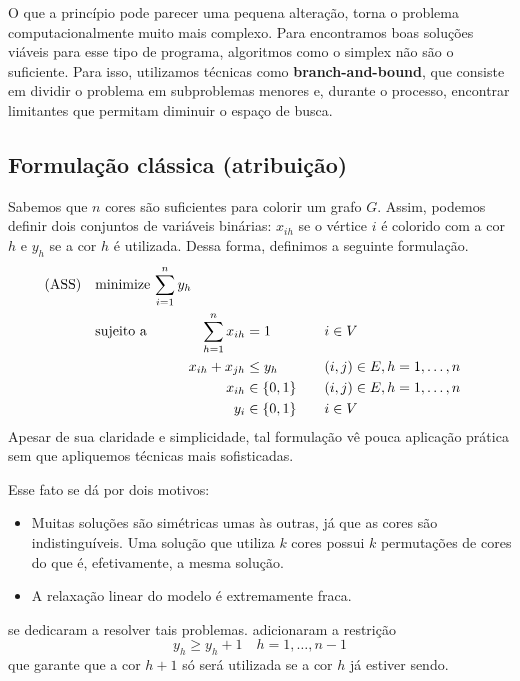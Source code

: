 \documentclass[11pt]{article}
\begin{document}
O que a princípio pode parecer uma pequena alteração, torna o problema computacionalmente muito mais complexo.
Para encontramos boas soluções viáveis para esse tipo de programa, algoritmos como o simplex não são o suficiente.
Para isso, utilizamos técnicas como \textbf{branch-and-bound}, que consiste em dividir o problema em subproblemas menores e, durante o processo, encontrar limitantes que permitam diminuir o espaço de busca.

\subsection{Formulação clássica (atribuição)}
\label{sec:org9003dfb}
Sabemos que \(n\) cores são suficientes para colorir um grafo \(G\). Assim, podemos definir dois conjuntos de variáveis binárias: \(x_{ih}\) se o vértice \(i\) é colorido com a cor \(h\) e \(y_h\) se a cor \(h\) é utilizada. Dessa forma, definimos a seguinte formulação.
\begin{alignat*}{4}
\mathrm{(ASS)} \quad & \omit\rlap{minimize  $\displaystyle \sum_{i=1}^n y_h$} \\
& \mbox{sujeito a}&& \quad & \sum_{h=1}^n x_{ih}&= 1        & \quad & i \in V \\
&                 &&   & x_{ih} + x_{jh}    & \leq y_h &   & (i,j) \in E, h=1,\dots,n \\
&                 &&   & x_{ih}    & \in \{0,1\} &   & (i,j) \in E, h=1,\dots,n\\
&                 &&   & y_i       & \in \{0,1\} &   & i \in V
\end{alignat*}
Apesar de sua claridade e simplicidade, tal formulação vê pouca aplicação prática sem que apliquemos técnicas mais sofisticadas.

Esse fato se dá por dois motivos:
\begin{itemize}
\item Muitas soluções são simétricas umas às outras, já que as cores são indistinguíveis. Uma solução que utiliza \(k\) cores possui \(k\) permutações de cores do que é, efetivamente, a mesma solução.
\item A relaxação linear do modelo é extremamente fraca.
\end{itemize}

\textcites{MendezDiaz2006BranchCutAlgorithm}[][]{MendezDiaz2008CuttingPlaneAlgorithm} se dedicaram a resolver tais problemas.
\textcite{MendezDiaz2006BranchCutAlgorithm} adicionaram a restrição
\[ y_h \geq y_h+1 \quad h = 1, \dots, n-1 \]
que garante que a cor \(h+1\) só será utilizada se a cor \(h\) já estiver sendo.
\end{document}
